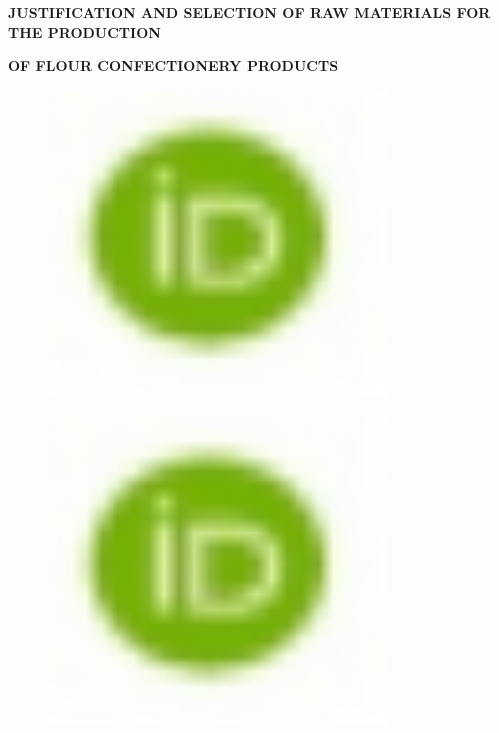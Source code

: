 
\hl{}

{\bfseries JUSTIFICATION AND SELECTION OF RAW MATERIALS FOR THE PRODUCTION}

{\bfseries OF FLOUR CONFECTIONERY PRODUCTS}

\begin{figure}[H]
	\centering
	\includegraphics[width=0.8\textwidth]{media/pish2/image2}
	\caption*{}
\end{figure}

\begin{figure}[H]
	\centering
	\includegraphics[width=0.8\textwidth]{media/pish2/image2}
	\caption*{}
\end{figure}

